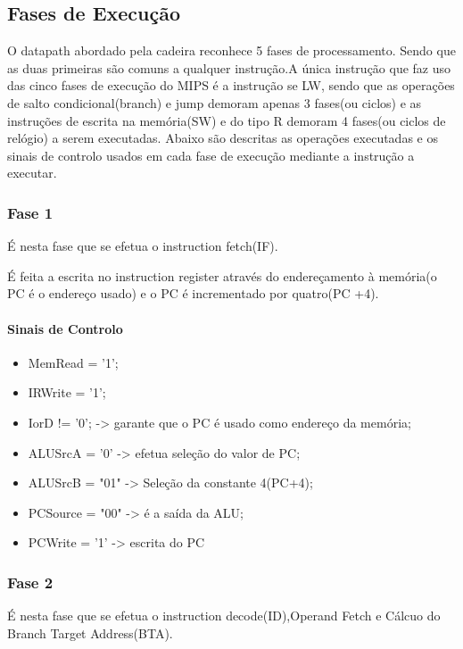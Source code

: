 \documentclass[10pt,a4paper]{book}
\begin{document}
		    \subsection{Fases de Execução}

		   O datapath abordado pela cadeira reconhece 5 fases de processamento. Sendo que as duas primeiras são comuns a qualquer instrução.A única instrução que faz uso das cinco fases de execução do MIPS é a instrução se LW, sendo que as operações de salto condicional(branch) e jump demoram apenas 3 fases(ou ciclos) e as instruções de escrita na memória(SW) e do tipo R demoram 4 fases(ou ciclos de relógio) a serem executadas.
		   Abaixo são descritas as operações executadas e os sinais de controlo usados em cada fase de execução mediante a instrução a executar.

			\subsubsection{Fase 1}

			É nesta fase que se efetua o instruction fetch(IF).

			É feita a escrita no instruction register através do endereçamento à memória(o PC é o endereço  usado) e o PC é incrementado por quatro(PC +4).

			\paragraph{Sinais de Controlo}

			\begin{itemize}
				\item MemRead = '1';
				\item IRWrite = '1';
				\item IorD != '0';	-> garante que o PC é usado como endereço da memória;
				\item ALUSrcA = '0' -> efetua seleção do valor de PC;
				\item ALUSrcB = "01" -> Seleção da constante 4(PC+4);
				\item PCSource = "00" -> é a saída da ALU;
				\item PCWrite = '1' -> escrita do PC
			\end{itemize}


			\subsubsection*{Fase 2}

			É nesta fase que se efetua o instruction decode(ID),Operand Fetch e Cálcuo do Branch Target Address(BTA).
\end{document}
